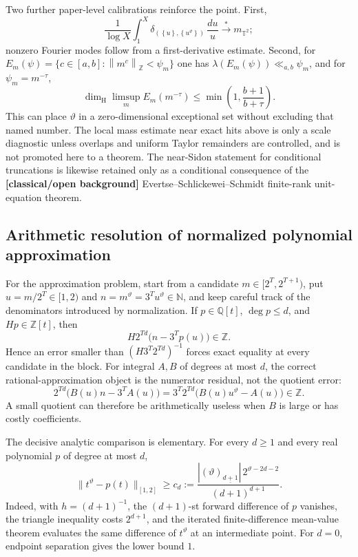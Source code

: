 \documentclass[11pt,oneside]{article}
\theoremstyle{definition}
\theoremstyle{remark}
\newcommand{\N}{\mathbb N}
\newcommand{\Z}{\mathbb Z}
\newcommand{\Q}{\mathbb Q}
\newcommand{\thetaq}{\vartheta}
\newcommand{\fract}[1]{\left\{#1\right\}}
\newcommand{\distZ}[1]{\left\lVert #1\right\rVert_{\Z}}
\newcommand{\fall}[2]{\left(#1\right)_{\!\underline{#2}}}
\newcommand{\statusknown}{\textcolor{classicalgray}{\textbf{[classical/open background]}}}
\begin{document}
Two further paper-level calibrations reinforce the point.  First,
\[
 \frac1{\log X}\int_1^X
 \delta_{(\fract u,\fract{u^{\thetaq}})}\,\frac{du}{u}
 \stackrel{*}{\longrightarrow}m_{\mathbb T^2};
\]
nonzero Fourier modes follow from a first-derivative estimate.  Second, for
$E_m(\psi)=\{c\in[a,b]:\distZ{m^c}<\psi_m\}$ one has
$\lambda(E_m(\psi))\ll_{a,b}\psi_m$, and for $\psi_m=m^{-\tau}$,
\begin{equation}
 \dim_{\mathrm H}\limsup_m E_m(m^{-\tau})
 \le\min\!\left(1,\frac{b+1}{b+\tau}\right).
 \label{ca:eq-metric-dimension}
\end{equation}
This can place $\thetaq$ in a zero-dimensional exceptional set without excluding that named
number.  The local mass estimate near exact hits above is only a scale diagnostic unless
overlaps and uniform Taylor remainders are controlled, and is not promoted here to a theorem.
The near-Sidon statement for conditional truncations is likewise retained only as a
conditional consequence of the \statusknown{} Evertse--Schlickewei--Schmidt finite-rank unit-equation
theorem.

\subsection{Arithmetic resolution of normalized polynomial approximation}
\label{ca:approximation-tax}

For the approximation problem, start from a candidate $m\in[2^T,2^{T+1})$, put
$u=m/2^T\in[1,2)$ and $n=m^{\thetaq}=3^Tu^{\thetaq}\in\N$, and keep careful track of the
denominators introduced by normalization.  If $p\in\Q[t]$, $\deg p\le d$, and
$Hp\in\Z[t]$, then
\begin{equation}
 H2^{Td}\bigl(n-3^Tp(u)\bigr)\in\Z.
 \label{ca:eq-normalized-clearing}
\end{equation}
Hence an error smaller than $(H3^T2^{Td})^{-1}$ forces exact equality at every candidate in
the block.  For integral $A,B$ of degrees at most $d$, the correct rational-approximation
object is the numerator residual, not the quotient error:
\begin{equation}
 2^{Td}\bigl(B(u)n-3^TA(u)\bigr)
 =3^T2^{Td}\bigl(B(u)u^{\thetaq}-A(u)\bigr)\in\Z.
 \label{ca:eq-rational-residual-clearing}
\end{equation}
A small quotient can therefore be arithmetically useless when $B$ is large or has costly
coefficients.

The decisive analytic comparison is elementary.  For every $d\ge1$ and every real polynomial
$p$ of degree at most $d$,
\begin{equation}
 \|t^{\thetaq}-p(t)\|_{[1,2]}
 \ge c_d:=
 \frac{|\fall{\thetaq}{d+1}|\,2^{\thetaq-2d-2}}{(d+1)^{d+1}}.
 \label{ca:eq-finite-difference-lower}
\end{equation}
Indeed, with $h=(d+1)^{-1}$, the $(d+1)$-st forward difference of $p$ vanishes, the triangle
inequality costs $2^{d+1}$, and the iterated finite-difference mean-value theorem evaluates the
same difference of $t^{\thetaq}$ at an intermediate point.  For $d=0$, endpoint separation
gives the lower bound $1$.
\end{document}
